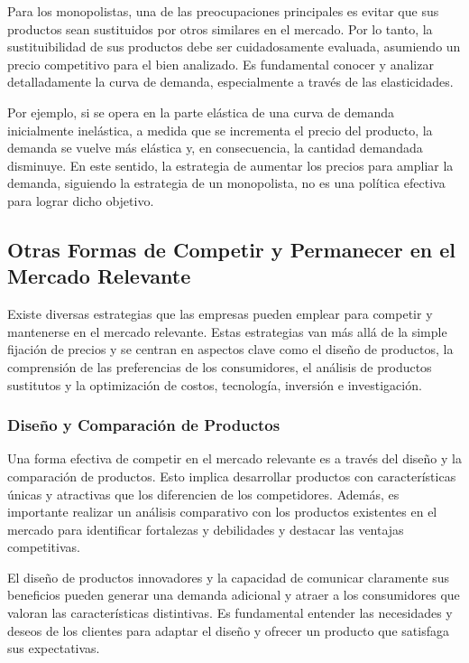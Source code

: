 \documentclass[
  a4paper,
]{article}
\theoremstyle{definition}
\theoremstyle{remark}
\begin{document}
Para los monopolistas, una de las preocupaciones principales es evitar
que sus productos sean sustituidos por otros similares en el mercado.
Por lo tanto, la sustituibilidad de sus productos debe ser
cuidadosamente evaluada, asumiendo un precio competitivo para el bien
analizado. Es fundamental conocer y analizar detalladamente la curva de
demanda, especialmente a través de las elasticidades.

Por ejemplo, si se opera en la parte elástica de una curva de demanda
inicialmente inelástica, a medida que se incrementa el precio del
producto, la demanda se vuelve más elástica y, en consecuencia, la
cantidad demandada disminuye. En este sentido, la estrategia de aumentar
los precios para ampliar la demanda, siguiendo la estrategia de un
monopolista, no es una política efectiva para lograr dicho objetivo.

\hypertarget{otras-formas-de-competir-y-permanecer-en-el-mercado-relevante}{%
\subsection{Otras Formas de Competir y Permanecer en el Mercado
Relevante}\label{otras-formas-de-competir-y-permanecer-en-el-mercado-relevante}}

Existe diversas estrategias que las empresas pueden emplear para
competir y mantenerse en el mercado relevante. Estas estrategias van más
allá de la simple fijación de precios y se centran en aspectos clave
como el diseño de productos, la comprensión de las preferencias de los
consumidores, el análisis de productos sustitutos y la optimización de
costos, tecnología, inversión e investigación.

\hypertarget{diseuxf1o-y-comparaciuxf3n-de-productos}{%
\subsubsection{Diseño y Comparación de
Productos}\label{diseuxf1o-y-comparaciuxf3n-de-productos}}

Una forma efectiva de competir en el mercado relevante es a través del
diseño y la comparación de productos. Esto implica desarrollar productos
con características únicas y atractivas que los diferencien de los
competidores. Además, es importante realizar un análisis comparativo con
los productos existentes en el mercado para identificar fortalezas y
debilidades y destacar las ventajas competitivas.

El diseño de productos innovadores y la capacidad de comunicar
claramente sus beneficios pueden generar una demanda adicional y atraer
a los consumidores que valoran las características distintivas. Es
fundamental entender las necesidades y deseos de los clientes para
adaptar el diseño y ofrecer un producto que satisfaga sus expectativas.
\end{document}
